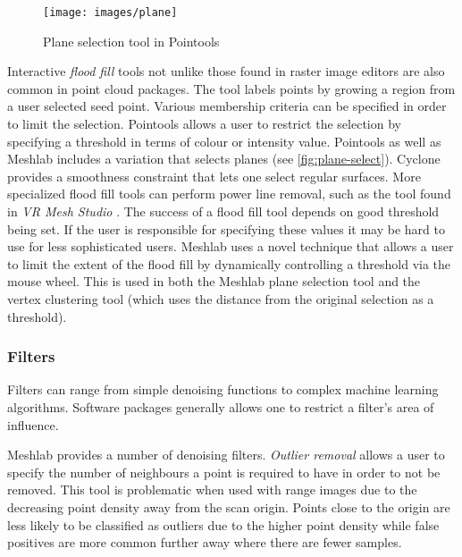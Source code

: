 
\begin{figure}[ht]
  \centering
  \texttt{[image: images/plane]}
  \caption{Plane selection tool in Pointools \cite{Pointools2012}}
  \label{fig:plane-select}
\end{figure}

Interactive \emph{flood fill} tools not unlike those found in raster image editors are also common in point cloud packages. The tool labels points by growing a region from a user selected seed point. Various membership criteria can be specified in order to limit the selection. Pointools \cite{Pointools2012} allows a user to restrict the selection by specifying a threshold in terms of colour or intensity value. Pointools as well as Meshlab includes a variation that selects planes (see \autoref{fig:plane-select}). Cyclone \cite{Leica2012} provides a smoothness constraint that lets one select regular surfaces. More specialized flood fill tools can perform power line removal, such as the tool found in \emph{VR Mesh Studio} \cite{VirtualGrid2012}. The success of a flood fill tool depends on good threshold being set. If the user is responsible for specifying these values it may be hard to use for less sophisticated users. Meshlab uses a novel technique that allows a user to limit the extent of the flood fill by dynamically controlling a threshold via the mouse wheel. This is used in both the Meshlab plane selection tool and the vertex clustering tool (which uses the distance from the original selection as a threshold).

\subsubsection{Filters} \label{section:filters}

Filters can range from simple denoising functions to complex machine learning algorithms. Software packages generally allows one to restrict a filter's area of influence.

Meshlab provides a number of denoising filters. \emph{Outlier removal} allows a user to specify the number of neighbours a point is required to have in order to not be removed. This tool is problematic when used with range images due to the decreasing point density away from the scan origin. Points close to the origin are less likely to be classified as outliers due to the higher point density while false positives are more common further away where there are fewer samples.

